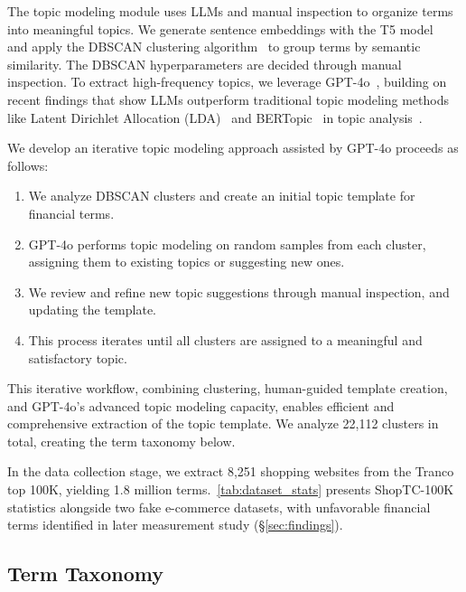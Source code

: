 

 The topic modeling module uses LLMs and manual inspection to organize terms into meaningful topics. We generate sentence embeddings with the T5 model~\citep{raffel2020exploring} and apply the DBSCAN clustering algorithm~\citep{ester1996density} to group terms by semantic similarity. The DBSCAN hyperparameters are decided through manual inspection. To extract high-frequency topics, we leverage GPT-4o~\citep{openai2023gpt4}, building on recent findings that show LLMs outperform traditional topic modeling methods like Latent Dirichlet Allocation (LDA)~\citep{blei2003latent} and BERTopic~\citep{grootendorst2022bertopic} in topic analysis~\citep{shrestha2023we, mu2024large}.



We develop an iterative topic modeling approach assisted by GPT-4o proceeds as follows: 
\begin{enumerate}
    \item We analyze DBSCAN clusters and create an initial topic template for financial terms.
    \item GPT-4o performs topic modeling on random samples from each cluster, assigning them to existing topics or suggesting new ones.
    \item We review and refine new topic suggestions through manual inspection, and updating the template.
    \item This process iterates until all clusters are assigned to a meaningful and satisfactory topic.
\end{enumerate}


This iterative workflow, combining clustering, human-guided template creation, and GPT-4o's advanced topic modeling capacity, enables efficient and comprehensive extraction of the topic template. We analyze 22,112 clusters in total, creating the \termname term taxonomy below.



 In the data collection stage, we extract 8,251 shopping websites from the Tranco top 100K, yielding 1.8 million terms.~\autoref{tab:dataset_stats} presents ShopTC-100K statistics alongside two fake e-commerce datasets, with unfavorable financial terms identified in later measurement study (\S\ref{sec:findings}). 



\subsection{\TermName Term Taxonomy}
\label{sec:financial_terms_section}




